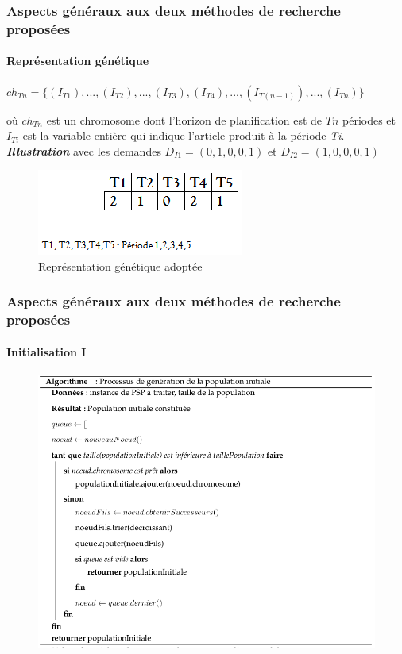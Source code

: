 \documentclass[11pt]{beamer}
\begin{document}
 \begin{frame}
 \frametitle{Aspects généraux aux deux méthodes de recherche proposées}
 \framesubtitle{Représentation génétique}
	
	\begin{center}
		$ch_{Tn} = \{(I_{T1}),..., (I_{T2}),..., (I_{T3}), (I_{T4}),...,(I_{T(n-1)}),...,  (I_{Tn})\}$ \\
	\end{center}
	\hspace*{.5cm} où $ch_{Tn}$ est un chromosome dont l'horizon de planification est de $Tn$ périodes et $I_{Ti}$ est la variable entière qui indique l'article produit à la période \emph{Ti}.  \\
	
	\hspace*{.5cm} \textsl{\textbf{Illustration}} avec les demandes $D_{I1} = (0,1,0,0,1)$ et $D_{I2} = (1,0,0,0,1)$ 
 \begin{figure}[!h]
		\begin{center}
			\includegraphics[scale=.5]{img/adopt_gene_repr.png}
			\caption{Représentation génétique adoptée}
			\label{fig:adopt_gene_repr}
		\end{center}
 \end{figure}
 \end{frame}
 
 \begin{frame}
 \frametitle{Aspects généraux aux deux méthodes de recherche proposées}
 \framesubtitle{Initialisation I}
	
	\begin{figure}[!h]
		\begin{center}
			\includegraphics[scale=.4]{img/init_algo.png}
			\label{fig:adopt_gene_repr}
		\end{center}
 \end{figure}
	
 \end{frame}
 
\end{document}
